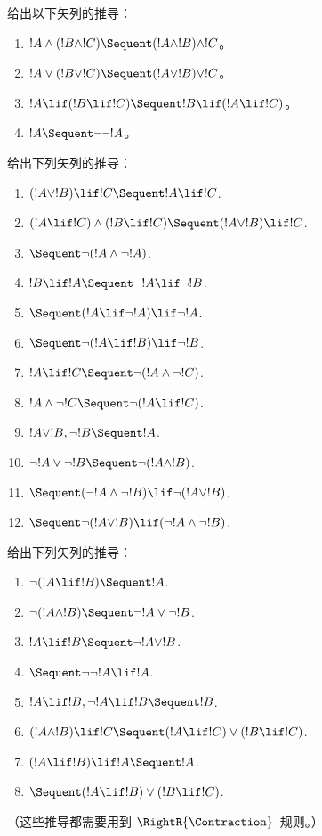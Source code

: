 \documentclass[../../../include/open-logic-section]{subfiles}
\begin{document}
\begin{prob}
给出以下矢列的推导：
\begin{enumerate}
\item $!A \land (!B \land !C) \Sequent (!A \land !B) \land !C$。
\item $!A \lor (!B \lor !C) \Sequent (!A \lor !B) \lor !C$。
\item $!A \lif (!B \lif !C) \Sequent !B \lif (!A \lif !C)$。
\item $!A \Sequent \lnot\lnot !A$。
\end{enumerate}
\end{prob}

\begin{prob}
给出下列矢列的推导：
\begin{enumerate}
\item $(!A \lor !B) \lif !C \Sequent !A \lif !C$.
\item $(!A \lif !C) \land (!B \lif !C) \Sequent (!A \lor !B) \lif !C$.
\item $\Sequent \lnot(!A \land \lnot !A)$.
\item $!B \lif !A \Sequent \lnot !A \lif \lnot !B$.
\item $\Sequent (!A \lif \lnot !A) \lif \lnot !A$.
\item $\Sequent \lnot(!A \lif !B) \lif \lnot !B$.
\item $!A \lif !C \Sequent \lnot (!A \land \lnot !C)$.
\item $!A \land \lnot !C \Sequent \lnot (!A \lif !C)$.
\item $!A \lor !B, \lnot !B \Sequent !A$.
\item $\lnot !A \lor \lnot !B \Sequent \lnot(!A \land !B)$.
\item $\Sequent (\lnot !A \land \lnot !B) \lif\lnot(!A \lor !B)$.
\item $\Sequent \lnot(!A \lor !B) \lif (\lnot !A \land \lnot !B)$.
\end{enumerate}
\end{prob}

\begin{prob}
给出下列矢列的推导：
\begin{enumerate}
\item $\lnot(!A \lif !B) \Sequent !A$.
\item $\lnot(!A \land !B) \Sequent \lnot !A \lor \lnot !B$.
\item $!A \lif !B \Sequent \lnot !A \lor !B$.
\item $\Sequent \lnot \lnot !A \lif !A$.
\item $!A \lif !B, \lnot !A \lif !B \Sequent !B$.
\item $(!A \land !B) \lif !C \Sequent (!A \lif !C) \lor (!B \lif !C)$.
\item $(!A \lif !B) \lif !A \Sequent !A$.
\item $\Sequent (!A \lif !B) \lor (!B \lif !C)$.
\end{enumerate}
（这些推导都需要用到 $\RightR{\Contraction}$~规则。）
\end{prob}
\end{document}
